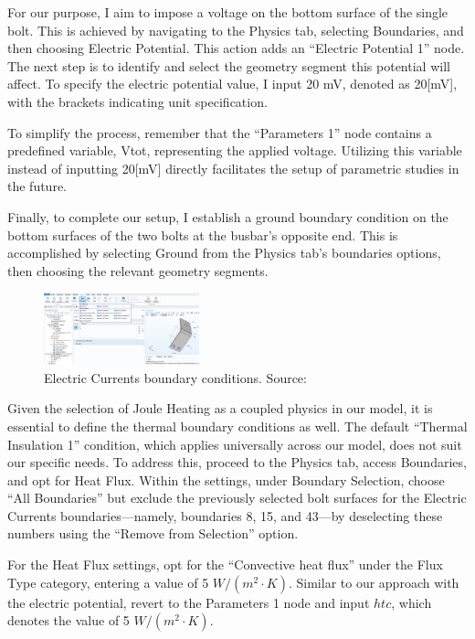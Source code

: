 For our purpose, I aim to impose a voltage on the bottom surface of the single bolt. This is achieved by navigating to the Physics tab, selecting Boundaries, and then choosing Electric Potential. This action adds an ``Electric Potential 1'' node. The next step is to identify and select the geometry segment this potential will affect. To specify the electric potential value, I input 20 mV, denoted as 20[mV], with the brackets indicating unit specification.

To simplify the process, remember that the ``Parameters 1'' node contains a predefined variable, Vtot, representing the applied voltage. Utilizing this variable instead of inputting 20[mV] directly facilitates the setup of parametric studies in the future.

Finally, to complete our setup, I establish a ground boundary condition on the bottom surfaces of the two bolts at the busbar's opposite end. This is accomplished by selecting Ground from the Physics tab's boundaries options, then choosing the relevant geometry segments.

\begin{figure}[ht!]
  \centering
  \includegraphics[width=0.4\textwidth]{Chapters/Figures/Chapter 3 Figures/Electric Currents Boundary Conditions.png}
  \caption{Electric Currents boundary conditions. Source: \cite{multiphysics__modeling_nodate}}
  \label{fig:Electric Currents boundary conditions}
\end{figure}

Given the selection of Joule Heating as a coupled physics in our model, it is essential to define the thermal boundary conditions as well. The default ``Thermal Insulation 1'' condition, which applies universally across our model, does not suit our specific needs. To address this, proceed to the Physics tab, access Boundaries, and opt for Heat Flux. Within the settings, under Boundary Selection, choose ``All Boundaries'' but exclude the previously selected bolt surfaces for the Electric Currents boundaries—namely, boundaries 8, 15, and 43—by deselecting these numbers using the ``Remove from Selection'' option.

For the Heat Flux settings, opt for the ``Convective heat flux'' under the Flux Type category, entering a value of 5 $W/(m^2\cdot K)$. Similar to our approach with the electric potential, revert to the Parameters 1 node and input $htc$, which denotes the value of 5 $W/(m^2\cdot K)$.

